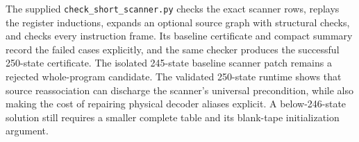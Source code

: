 The supplied \texttt{check\_short\_scanner.py} checks the exact scanner
rows, replays the register inductions, expands an optional source graph
with structural checks, and checks every instruction frame.  Its
baseline certificate and compact summary record the failed cases
explicitly, and the same checker produces the successful 250-state
certificate.  The isolated 245-state baseline scanner patch remains
a rejected whole-program candidate.  The validated 250-state runtime
shows that source reassociation can discharge the scanner's universal
precondition, while also making the cost of repairing physical decoder
aliases explicit.  A below-246-state solution still requires a smaller
complete table and its blank-tape initialization argument.
